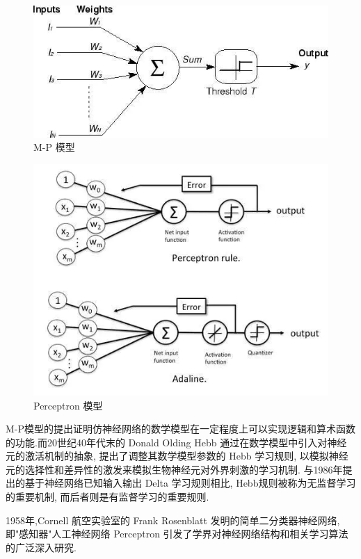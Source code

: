 \begin{figure}
	\includegraphics[scale=0.7]{Figures/mpmodel.png}
	\caption{M-P 模型}
\end{figure}
\begin{figure}
	\includegraphics[scale=0.7]{Figures/perceptron.png}
	\caption{Perceptron 模型}
\end{figure}


M-P模型的提出证明仿神经网络的数学模型在一定程度上可以实现逻辑和算术函数的功能.而20世纪40年代末的 Donald Olding Hebb 通过在数学模型中引入对神经元的激活机制的抽象, 提出了调整其数学模型参数的 Hebb 学习规则, 以模拟神经元的选择性和差异性的激发来模拟生物神经元对外界刺激的学习机制. 与1986年提出的基于神经网络已知输入输出 Delta 学习规则相比, Hebb规则被称为无监督学习的重要机制, 而后者则是有监督学习的重要规则.

1958年,Cornell 航空实验室的 Frank Rosenblatt 发明的简单二分类器神经网络,即"感知器"人工神经网络 Perceptron 引发了学界对神经网络结构和相关学习算法的广泛深入研究.

